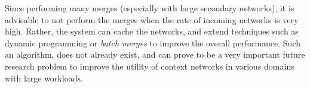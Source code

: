 Since performing many merges (especially with large secondary networks), it is advisable to not perform the merges when the rate of incoming networks is very high. Rather, the system can cache the networks, and extend techniques such as dynamic programming or \textit{batch merges} to improve the overall performance. Such an algorithm, does not already exist, and can prove to be a very important future research problem to improve the utility of context networks in various domains with large workloads.





